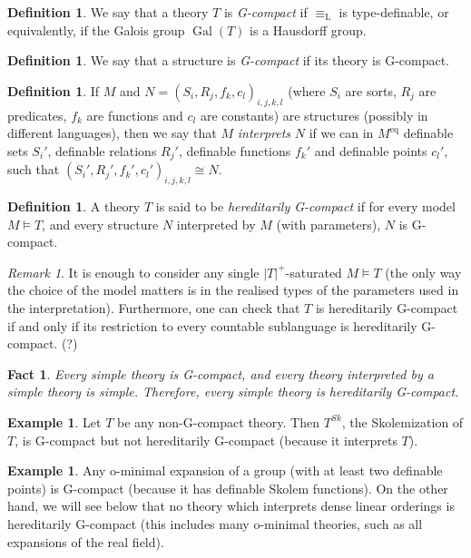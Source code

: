 \documentclass[final,a4paper,12pt]{amsart}
\newcommand\Lasc{{\mathrm{L}}}
\newcommand{\eq}{\mathrm{eq}}
\DeclareMathOperator{\Gal}{{Gal}}
\newtheorem{fct}[thm]{Fact}
\theoremstyle{remark}
\newtheorem{rem}[thm]{Remark}
\theoremstyle{definition}
\newtheorem{dfn}[thm]{Definition}
\newtheorem{ex}[thm]{Example}
\begin{document}
	\begin{dfn}
		We say that a theory $T$ is \emph{G-compact} if $\equiv_\Lasc$ is type-definable, or equivalently, if the Galois group $\Gal(T)$ is a Hausdorff group.
	\end{dfn}
	
	\begin{dfn}
		We say that a structure is \emph{G-compact} if its theory is G-compact.
	\end{dfn}
	
	\begin{dfn}
		If $M$ and $N=(S_i,R_j,f_k,c_l)_{i,j,k,l}$ (where $S_i$ are sorts, $R_j$ are predicates, $f_k$ are functions and $c_l$ are constants) are structures (possibly in different languages), then we say that $M$ \emph{interprets} $N$ if we can in $M^{\eq}$ definable sets $S_i'$, definable relations $R_j'$, definable functions $f_k'$ and definable points $c_l'$, such that $(S_i',R_j',f_k',c_l')_{i,j,k,l}\cong N$.
	\end{dfn}
	
	\begin{dfn}
		A theory $T$ is said to be \emph{hereditarily G-compact} if for every model $M\models T$, and every structure $N$ interpreted by $M$ (with parameters), $N$ is G-compact.
	\end{dfn}
	
	\begin{rem}
		It is enough to consider any single $\lvert T\rvert^+$-saturated $M\models T$ (the only way the choice of the model matters is in the realised types of the parameters used in the interpretation). Furthermore, one can check that $T$ is hereditarily G-compact if and only if its restriction to every countable sublanguage is hereditarily G-compact. (?)
	\end{rem}
	
	\begin{fct}
		Every simple theory is G-compact, and every theory interpreted by a simple theory is simple. Therefore, every simple theory is hereditarily G-compact.
	\end{fct}
	
	
	\begin{ex}
		Let $T$ be any non-G-compact theory. Then $T^{Sk}$, the Skolemization of $T$, is G-compact but not hereditarily G-compact (because it interprets $T$).
	\end{ex}
	
	\begin{ex}
		Any o-minimal expansion of a group (with at least two definable points) is G-compact (because it has definable Skolem functions). On the other hand, we will see below that no theory which interprets dense linear orderings is hereditarily G-compact (this includes many o-minimal theories, such as all expansions of the real field).
	\end{ex}
	
\end{document}
